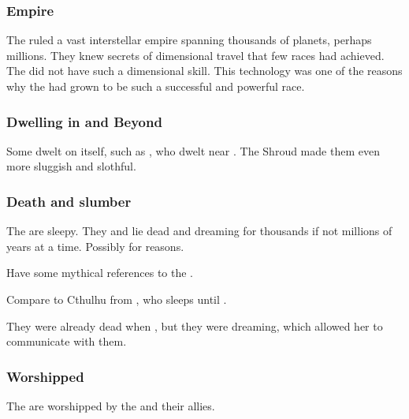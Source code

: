\subsubsection{Empire}
The \xss ruled a vast interstellar empire spanning thousands of planets, perhaps millions. 
They knew secrets of dimensional travel that few races had achieved.
The \banes did not have such a dimensional \travelling skill. 
This technology was one of the reasons why the \xss had grown to be such a successful and powerful race. 




\subsubsection{Dwelling in \Miith and Beyond}
Some \xss dwelt on \Miith itself, such as , who dwelt near \Yormis.
The Shroud made them even more sluggish and slothful. 





\subsubsection{Death and slumber}
The \xss{} are sleepy. They  and lie dead and dreaming for thousands if not millions of years at a time. 
Possibly for  reasons. 

Have some mythical references to the .

Compare to Cthulhu from , who sleeps until . 

They were already dead when , but they were dreaming, which allowed her to communicate with them.





\subsubsection{Worshipped}
The \xss{} are worshipped by the \dragons{} and their allies. 

